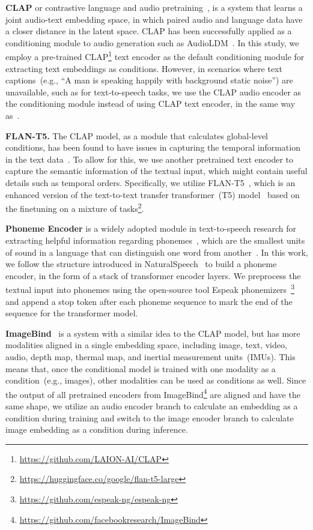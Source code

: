 \documentclass[lettersize,journal]{IEEEtran}
\begin{document}
\noindent
\textbf{CLAP} or contrastive language and audio pretraining~\cite{wu2023large-clap}, is a system that learns a joint audio-text embedding space, in which paired audio and language data have a closer distance in the latent space. CLAP has been successfully applied as a conditioning module to audio generation such as AudioLDM~\cite{liu2023audioldm}. In this study, we employ a pre-trained CLAP\footnote{\url{https://github.com/LAION-AI/CLAP}} text encoder as the default conditioning module for extracting text embeddings as conditions. However, in scenarios where text captions~(e.g., ``A man is speaking happily with background static noise'') are unavailable, such as for text-to-speech tasks, we use the CLAP audio encoder as the conditioning module instead of using CLAP text encoder, in the same way as~\cite{liu2023audioldm}.



\noindent
\textbf{FLAN-T5.} The CLAP model, as a module that calculates global-level conditions, has been found to have issues in capturing the temporal information in the text data~\cite{wu2023audio}. To allow for this, we use another pretrained text encoder to capture the semantic information of the textual input, which might contain useful details such as temporal orders. Specifically, we utilize FLAN-T5~\cite{chung2022scaling-flan-t5}, which is an enhanced version of the text-to-text transfer transformer~(T5) model~\cite{raffel2020exploring} based on the finetuning on a mixture of tasks\footnote{\url{https://huggingface.co/google/flan-t5-large}}. 

\noindent
\textbf{Phoneme Encoder} is a widely adopted module in text-to-speech research for extracting helpful information regarding phonemes~\cite{Fastspeech2, tan2022naturalspeech}, which are the smallest units of sound in a language that can distinguish one word from another~\cite{tan2023neural}. In this work, we follow the structure introduced in NaturalSpeech~\cite{tan2022naturalspeech} to build a phoneme encoder, in the form of a stack of transformer encoder layers. We preprocess the textual input into phonemes using the open-source tool Espeak phonemizers~\footnote{\url{https://github.com/espeak-ng/espeak-ng}} and append a stop token after each phoneme sequence to mark the end of the sequence for the transformer model. 

\noindent
\textbf{ImageBind}~\cite{girdhar2023imagebind} is a system with a similar idea to the CLAP model, but has more modalities aligned in a single embedding space, including image, text, video, audio, depth map, thermal map, and inertial measurement units~(IMUs). This means that, once the conditional model is trained with one modality as a condition~(e.g., images), other modalities can be used as conditions as well. Since the output of all pretrained encoders from ImageBind\footnote{\url{https://github.com/facebookresearch/ImageBind}} are aligned and have the same shape, we utilize an audio encoder branch to calculate an embedding as a condition during training and switch to the image encoder branch to calculate image embedding as a condition during inference.
\end{document}
